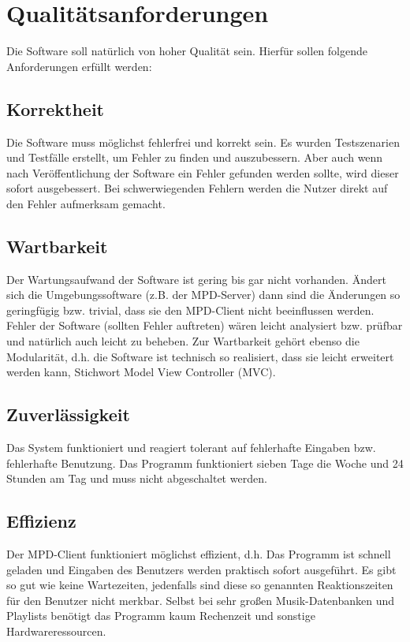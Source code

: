\section{Qualitätsanforderungen}
Die Software soll natürlich von hoher Qualität sein. Hierfür sollen folgende
Anforderungen erfüllt werden:
\subsection{Korrektheit}
Die Software muss möglichst fehlerfrei und korrekt sein. Es wurden Testszenarien und Testfälle erstellt,
um Fehler zu finden und auszubessern. Aber auch wenn nach Veröffentlichung der Software ein 
Fehler gefunden werden sollte, wird dieser sofort ausgebessert. Bei schwerwiegenden Fehlern
werden die Nutzer direkt auf den Fehler aufmerksam gemacht.
\subsection{Wartbarkeit}
Der Wartungsaufwand der Software ist gering bis gar nicht vorhanden. Ändert sich die Umgebungssoftware
(z.B. der MPD-Server) dann sind die Änderungen so geringfügig bzw. trivial, dass sie den MPD-Client 
nicht beeinflussen werden. Fehler der Software (sollten Fehler auftreten) wären leicht analysiert bzw.
prüfbar und natürlich auch leicht zu beheben. Zur Wartbarkeit gehört ebenso die Modularität, d.h.
die Software ist technisch so realisiert, dass sie leicht erweitert werden kann, Stichwort Model View
Controller (MVC). 
\subsection{Zuverlässigkeit}
Das System funktioniert und reagiert tolerant auf fehlerhafte Eingaben bzw. fehlerhafte Benutzung.
Das Programm funktioniert sieben Tage die Woche und 24 Stunden am Tag und muss nicht abgeschaltet werden.

\subsection{Effizienz}
Der MPD-Client funktioniert möglichst effizient, d.h. Das Programm ist schnell geladen und Eingaben des Benutzers
werden praktisch sofort ausgeführt. Es gibt so gut wie keine Wartezeiten, jedenfalls sind diese 
so genannten Reaktionszeiten für den Benutzer nicht merkbar. Selbst bei sehr großen Musik-Datenbanken
und Playlists benötigt das Programm kaum Rechenzeit und sonstige Hardwareressourcen.

